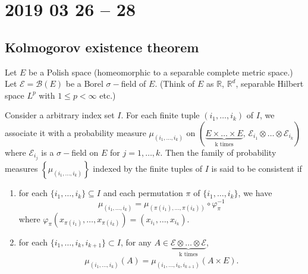 \section{2019 03 26 -- 28}

\subsection{Kolmogorov existence theorem}

\begin{definition}
	Let $E$ be a Polish space (homeomorphic to a separable complete metric space.)
	Let $\mathcal{E} = \mathcal{B}(E)$ be a Borel $\sigma-$field of $E$. (Think of $E$ as $\mathbb{R}$, $\mathbb{R}^d$, separable Hilbert space $L^p$ with $1 \leq p < \infty$ etc.)
	
	Consider a arbitrary index set $I$. For each finite tuple $( i_1, \ldots, i_k )$ of $I$, we associate it with a probability measure $\mu_{( i_1,\ldots,i_k)}$ on $( \underbrace{E \times \ldots \times E}_\text{k times}, \, \mathcal{E}_{i_1} \otimes \ldots \otimes \mathcal{E}_{i_k})$ where $\mathcal{E}_{i_j}$ is a $\sigma-$field on $E$ for $j=1,\ldots,k$. Then the family of probability measures $\left\{ \mu_{(i_1,\ldots,i_k)} \right\}$ indexed by the finite tuples of $I$ is said to be consistent if
	\begin{enumerate}
		\item for each $\{ i_1, \ldots, i_k\}\subseteq I $ and each permutation $\pi$ of $\{i_1,\ldots,i_k\}$, we have
		$$
			\mu_{(i_1,\ldots,i_k)} =\mu_{(\pi(i_1), \ldots, \pi(i_k) )} \circ \varphi_\pi^{-1}
		$$
		where
		$
			\varphi_\pi(x_{\pi(i_1)}, \ldots, x_{\pi(i_k)}) = (x_{i_1}, \ldots, x_{i_k}).
		$
		\item for each $\{i_1, \ldots, i_k, i_{k+1} \} \subset I$, for any $A \in \underbrace{\mathcal{E} \otimes \ldots \otimes \mathcal{E}}_\text{k times}$,
		$$
			\mu_{( i_1,\ldots,i_k)}(A) = \mu_{(i_1,\ldots, i_k, i_{k+1})}(A \times E).
		$$
	\end{enumerate} 
\end{definition}

